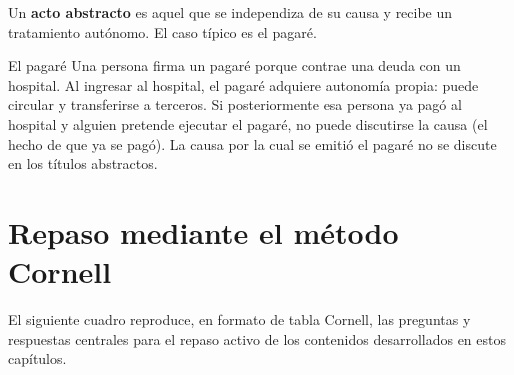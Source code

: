 \documentclass[12pt,oneside]{book}
\begin{document}

Un \textbf{acto abstracto} es aquel que se independiza de su causa y recibe un tratamiento autónomo. El caso típico es el pagaré.

\begin{example}{El pagaré}
Una persona firma un pagaré porque contrae una deuda con un hospital. Al ingresar al hospital, el pagaré adquiere autonomía propia: puede circular y transferirse a terceros. Si posteriormente esa persona ya pagó al hospital y alguien pretende ejecutar el pagaré, no puede discutirse la causa (el hecho de que ya se pagó). La causa por la cual se emitió el pagaré no se discute en los títulos abstractos.
\end{example}

\section{Repaso mediante el método Cornell}

El siguiente cuadro reproduce, en formato de tabla Cornell, las preguntas y respuestas centrales para el repaso activo de los contenidos desarrollados en estos capítulos.
\end{document}
